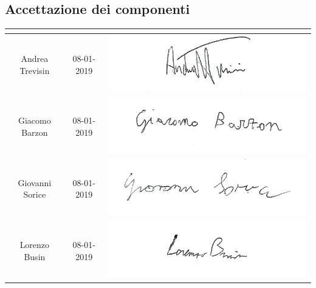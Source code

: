 \subsection{Accettazione dei componenti}
\renewcommand{\arraystretch}{2}
\begin{table}[H]
\begin{center}
  \begin{tabular}{| c | c | c |}
    \hline
    \rowcolor{title_row}
    \textbf{\color{title_text}{Nominativo}} & \textbf{\color{title_text}{Data}} & \textbf{\color{title_text}{Firma}} \\ \hline
    Andrea Trevisin & 08-01-2019 & \includegraphics[align=c,scale=1]{Res/Firme/andrea.png} \\ \hline
    Giacomo Barzon & 08-01-2019 & \includegraphics[align=c,scale=1]{Res/Firme/giacomo.png} \\ \hline
    Giovanni Sorice & 08-01-2019 & \includegraphics[align=c,scale=1]{Res/Firme/ciro.png} \\ \hline
    Lorenzo Busin & 08-01-2019 & \includegraphics[align=c,scale=1]{Res/Firme/lorenzo.png} \\ \hline

\end{tabular}
\end{center}
\end{table}
